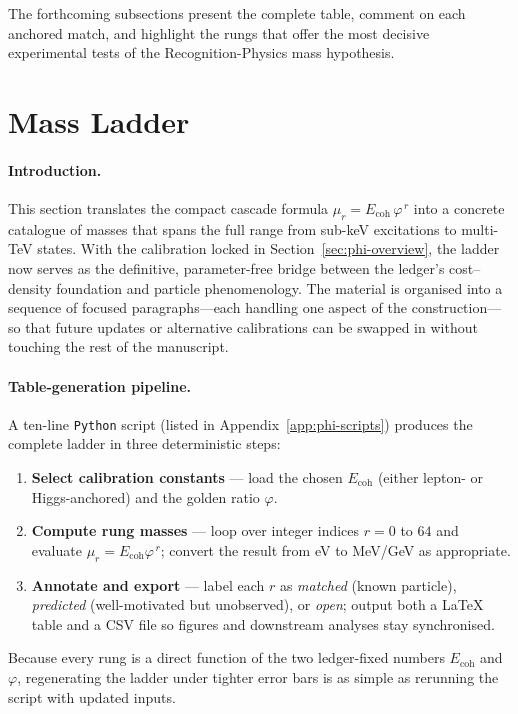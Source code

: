 \documentclass[11pt,oneside]{book}
\begin{document}
\smallskip
The forthcoming subsections present the complete table, comment on each
anchored match, and highlight the rungs that offer the most decisive
experimental tests of the Recognition-Physics mass hypothesis.

\section{Mass Ladder}
\label{sec:mass-ladder}

\paragraph*{Introduction.}
This section translates the compact cascade formula
\(\mu_r = E_{\text{coh}}\,\varphi^{\,r}\) into a concrete catalogue of
masses that spans the full range from sub-keV excitations to multi-TeV
states.  With the calibration locked in Section~\ref{sec:phi-overview},
the ladder now serves as the definitive, parameter-free bridge between
the ledger’s cost–density foundation and particle phenomenology.  The
material is organised into a sequence of focused paragraphs—each
handling one aspect of the construction—so that future updates or
alternative calibrations can be swapped in without touching the rest of
the manuscript.

\paragraph*{Table-generation pipeline.}
A ten-line \texttt{Python} script (listed in Appendix~\ref{app:phi-scripts})
produces the complete ladder in three deterministic steps:
\begin{enumerate}
   \item \textbf{Select calibration constants} — load the chosen
         \(E_{\text{coh}}\) (either lepton- or Higgs-anchored) and the
         golden ratio \(\varphi\).
   \item \textbf{Compute rung masses} — loop over integer indices
         \(r = 0\) to \(64\) and evaluate
         \(\mu_r = E_{\text{coh}}\varphi^{\,r}\); convert the result from
         eV to MeV/GeV as appropriate.
   \item \textbf{Annotate and export} — label each \(r\) as
         \textit{matched} (known particle), \textit{predicted}
         (well-motivated but unobserved), or \textit{open}; output both a
         LaTeX table and a CSV file so figures and downstream analyses
         stay synchronised.
\end{enumerate}
Because every rung is a direct function of the two ledger-fixed numbers
\(E_{\text{coh}}\) and \(\varphi\), regenerating the ladder under tighter
error bars is as simple as rerunning the script with updated inputs.
\end{document}
